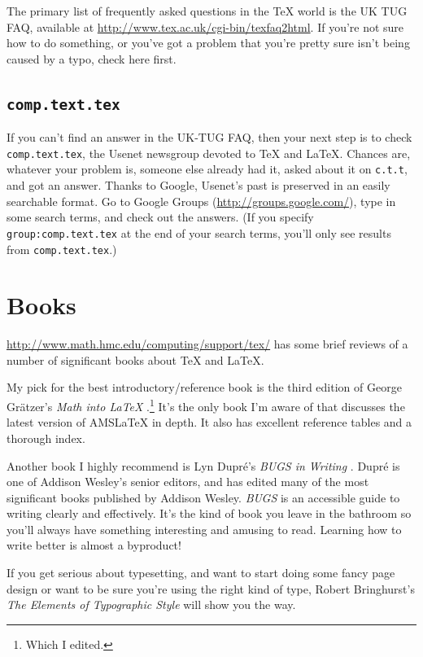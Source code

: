 \documentclass{icmmcm}
\newcommand{\ctt}{\texttt{comp.text.tex}\xspace}
\newcommand{\tex}{\TeX\xspace}
\newcommand{\latex}{\LaTeX\xspace}
\begin{document}
{The primary list of frequently asked questions in the \tex world is
the UK TUG FAQ, available at
\url{http://www.tex.ac.uk/cgi-bin/texfaq2html}.  If you're not sure
how to do something, or you've got a problem that you're pretty sure
isn't being caused by a typo, check here first.


\subsection{\ctt}

If you can't find an answer in the UK-TUG FAQ, then your next step is
to check \ctt, the Usenet newsgroup devoted to \tex and \latex.
Chances are, whatever your problem is, someone else already had it,
asked about it on \texttt{c.t.t}, and got an answer.  Thanks to Google, Usenet's
past is preserved in an easily searchable format.  Go to Google Groups
(\url{http://groups.google.com/}), type in some search terms, and
check out the answers.  (If you specify \texttt{group:comp.text.tex}
at the end of your search terms, you'll only see results from \ctt.)


\section{Books}

\url{http://www.math.hmc.edu/computing/support/tex/} has some brief
reviews of a number of significant books about \tex and \latex.

My pick for the best introductory/reference book is the third edition
of George Gr\"{a}tzer's \emph{Math into \latex{}}
\citeyearpar{gratzer-mil}.\footnote{Which I edited.}  It's the only book I'm
aware of that discusses the latest version of AMS\latex in depth.  It
also has excellent reference tables and a thorough index.

Another book I highly recommend is Lyn Dupr\'{e}'s \emph{BUGS in
  Writing} \citeyearpar{dupre-bugs}.  Dupr\'{e} is one of Addison Wesley's
senior editors, and has edited many of the most significant books
published by Addison Wesley.  \emph{BUGS} is an accessible guide to
writing clearly and effectively.  It's the kind of book you leave in
the bathroom so you'll always have something interesting and amusing
to read.  Learning how to write better is almost a byproduct!

If you get serious about typesetting, and want to start doing some
fancy page design or want to be sure you're using the right kind of
type, Robert Bringhurst's \emph{The Elements of Typographic Style}
\citeyearpar{bringhurst-elements} will show you the way.

}
\end{document}
